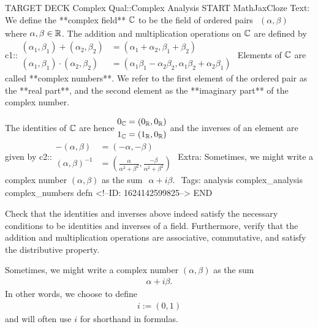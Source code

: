 \documentclass{memoir}
\begin{document}
\begin{anki}
TARGET DECK
Complex Qual::Complex Analysis
START
MathJaxCloze
Text: We define the **complex field** \(\mathbb{C}\) to be the field of ordered pairs
\(\begin{align*}
  	(\alpha ,\beta )
  \end{align*}\)
where \(\alpha ,\beta  \in \mathbb{R}\). The addition and multiplication operations on \(\mathbb{C}\) are defined by
{{c1::\(\begin{align*}
        	(\alpha_1,\beta_1) + (\alpha_2,\beta_2) &= (\alpha_1+\alpha_2,\beta_1+\beta_2)\\
        	(\alpha_1,\beta_1)\cdot (\alpha_2,\beta_2) &= (\alpha_1\beta_1 - \alpha_2\beta_2, \alpha_1\beta_2+\alpha_2\beta_1)
        \end{align*}\)}}
Elements of \(\mathbb{C}\) are called **complex numbers**. We refer to the first element of the ordered pair as the **real part**, and the second element as the **imaginary part** of the complex number.

The identities of \(\mathbb{C}\) are hence
\(\begin{align*}
  	0_{\mathbb{C}} &= (0_{\mathbb{R}},0_{\mathbb{R}})\\
  	1_{\mathbb{C}} &= (1_{\mathbb{R}},0_{\mathbb{R}})
  \end{align*}\)
and the inverses of an element are given by
 {{c2::\(\begin{align*}
        	-(\alpha,\beta ) &= (-\alpha ,-\beta )\\
        	(\alpha ,\beta)^{-1} &= \left( \frac{\alpha }{\alpha^2+\beta^2}, \frac{-\beta }{\alpha^2+\beta^2} \right) 
        \end{align*}\)}} 
Extra: Sometimes, we might write a complex number \((\alpha ,\beta )\) as the sum
\(\begin{align*}
	\alpha + i\beta .
\end{align*}\)
Tags: analysis complex_analysis complex_numbers defn
<!--ID: 1624142599825-->
END
\end{anki}

\begin{hw}
	Check that the identities and inverses above indeed satisfy the necessary conditions to be identities and inverses of a field. Furthermore, verify that the addition and multiplication operations are associative, commutative, and satisfy the distributive property.
\end{hw}

Sometimes, we might write a complex number \((\alpha ,\beta )\) as the sum
\begin{align*}
	\alpha + i\beta .
\end{align*}
In other words, we choose to define
\begin{align*}
	i:= (0,1)
\end{align*}
and will often use \(i\) for shorthand in formulas.\\
\end{document}

